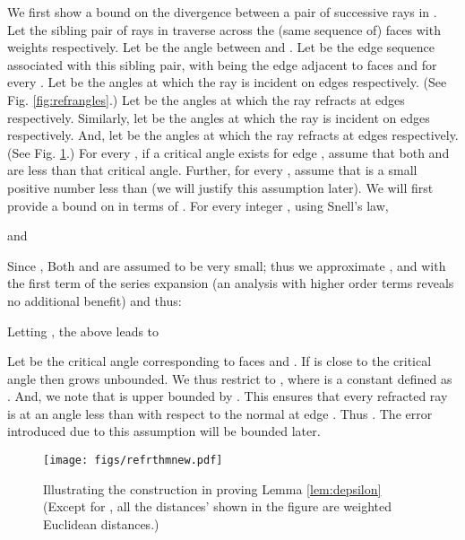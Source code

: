 \documentclass[11pt]{article}
\newenvironment{proof}{\par\noindent{\bf Proof:}}{\mbox{}\hfill\\}
\begin{document}
\begin{proof}
We first show a  bound on the divergence between a pair of successive rays  in .
Let the sibling pair of rays  in  traverse across the (same sequence of) faces  with weights  respectively.
Let  be the angle between  and .
Let  be the edge sequence associated with this sibling pair, with  being the edge
adjacent to faces  and  for every .
Let  be the angles at which the ray  is incident on edges  respectively.
(See Fig. \ref{fig:refrangles}.)
Let  be the angles at which the ray  refracts at edges  respectively. 
Similarly, let  be the angles at which the ray  is incident on edges  respectively.
And, let  be the angles at which the ray  refracts at edges  respectively. 
(See Fig. \ref{fig:refrthm}.)
For every , if a critical angle exists for edge , assume that both  and  are less than that critical angle.
Further, for every , assume that  is a small positive number less than 
(we will justify this assumption later). We will first provide a bound on  in terms of .  \hfil\break
\hfil\break
For every integer , using Snell's law,
 
and 
 
Since ,  
Both  and  are assumed to be very small; thus we approximate , and  with the first term of the series expansion (an analysis with higher order  terms reveals no additional benefit) and thus:

Letting , the above leads to  


Let  be the critical angle corresponding to faces  and .
If  is close to the critical angle  then  grows unbounded. 
We thus restrict  to , where  is a constant defined as . 
And, we note that  is upper bounded by .
This ensures that every refracted ray is at an angle less than  with respect to the normal at edge .
Thus .
The error introduced due to this assumption will be bounded later.

\begin{figure}[h]
\begin{minipage}[t]{\linewidth}
\begin{center}
\texttt{[image: figs/refrthmnew.pdf]}
\caption{\footnotesize
Illustrating the construction in proving Lemma \ref{lem:depsilon}
\scriptsize{}
(Except for , all the distances' shown in the figure are weighted Euclidean distances.)
\normalsize{}
}
\label{fig:refrthm}
\end{center}
\end{minipage}
\vspace*{-0.1in}
\end{figure}


\end{proof}
\end{document}
